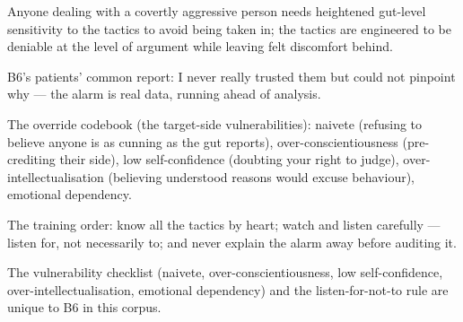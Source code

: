 

\begin{distilled}
  \item Anyone dealing with a covertly aggressive person needs heightened gut-level sensitivity to the tactics to avoid being taken in; the tactics are engineered to be deniable at the level of argument while leaving felt discomfort behind.
  \item B6's patients' common report: I never really trusted them but could not pinpoint why --- the alarm is real data, running ahead of analysis.
  \item The override codebook (the target-side vulnerabilities): naivete (refusing to believe anyone is as cunning as the gut reports), over-conscientiousness (pre-crediting their side), low self-confidence (doubting your right to judge), over-intellectualisation (believing understood reasons would excuse behaviour), emotional dependency.
  \item The training order: know all the tactics by heart; watch and listen carefully --- listen for, not necessarily to; and never explain the alarm away before auditing it.
\end{distilled}
\begin{unique}
  \item The vulnerability checklist (naivete, over-conscientiousness, low self-confidence, over-intellectualisation, emotional dependency) and the listen-for-not-to rule are unique to B6 in this corpus.
\end{unique}

